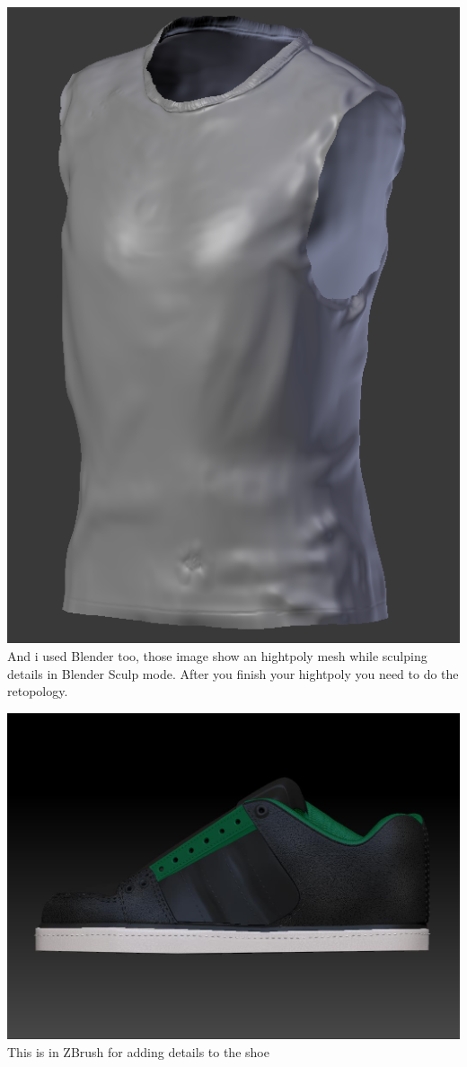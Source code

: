\documentclass{article}
\begin{document}
  \includegraphics[width=\textwidth]{61.png}
  And i used Blender too, those image show an hightpoly mesh while sculping details in Blender Sculp mode. After you finish your hightpoly you need to do the retopology.

  \includegraphics[width=\textwidth]{5.jpg}
  This is in ZBrush for adding details to the shoe
\end{document}
